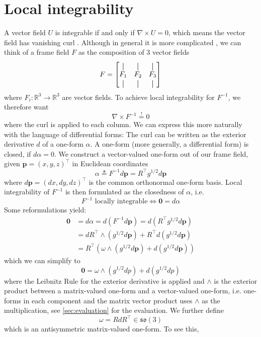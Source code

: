 \documentclass[../thesis.tex]{subfiles}
\begin{document}
\section{Local integrability}
A vector field $U$ is integrable if and only if $\nabla \times U = 0$,
which means the vector field has vanishing curl \cite{Pap20}.
Although in general it is more complicated \cite{Nieser}, we can think of a frame field $F$ as the composition of 3 vector fields
$$F = \begin{bmatrix}
  \vertbar & \vertbar & \vertbar \\
  F_1 & F_2 & F_3 \\
  \vertbar & \vertbar & \vertbar
\end{bmatrix}$$
where $F_i : \mathbb{R}^3 \to \mathbb{R}^3$ are vector fields.
To achieve local integrability for $F^{-1}$, we therefore want
$$\nabla \times F^{-1} \overset{!}{=}0$$
where the curl is applied to each column.
We can express this more naturally with the language of differential forms:
The curl can be written as the exterior derivative $d$ of a one-form $\alpha$.
A one-form (more generally, a differential form) is closed, if $d\alpha = 0$.
We construct a vector-valued one-form out of our frame field,
given $\bm{p}=(x,y,z)^{\top}$ in Euclidean coordinates
$$\alpha \triangleq F^{-1}d\bm{p} = R^{\top}g^{1/2}d\bm{p}$$
where $d\bm{p} = (dx,dy,dz)^{\top}$ is the common orthonormal one-form basis.
Local integrability of $F^{-1}$ is then formulated as the closedness of $\alpha$, i.e.
$$F^{-1} \text{ locally integrable} \iff \bm{0} = d\alpha$$
Some reformulations yield:
\begin{align*}
  \bm{0} &= d\alpha = d(F^{-1}d\bm{p}) = d(R^{\top}g^{1/2}d\bm{p})\\
  &= dR^{\top} \wedge  (g^{1/2}d\bm{p}) + R^{\top}d(g^{1/2}d\bm{p}) \\
  &= R^{\top}(\omega \wedge (g^{1/2}d\bm{p})+ d(g^{1/2}d\bm{p}))
\end{align*}
which we can simplify to
\begin{equation}\label{eq:oneform}
  \bm{0} = \omega \wedge (g^{1/2}dp)+ d(g^{1/2}dp)
\end{equation}
where the Leibnitz Rule for the exterior derivative is applied
and $\wedge$ is the exterior product between a matrix-valued one-form and a vector-valued one-form,
i.e. one-forms in each component and the matrix vector product uses $\wedge$
as the multiplication, see \ref{sec:evaluation} for the evaluation.
We further define
$$\omega = RdR^{\top} \in \mathfrak{so}(3)$$
which is an antisymmetric matrix-valued one-form. To see this, 
\end{document}
